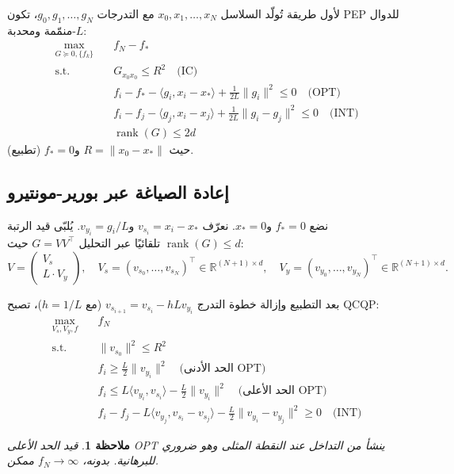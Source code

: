 \documentclass[12pt,a4paper]{article}
\newcommand{\R}{\mathbb{R}}
\theoremstyle{arabicremark}
\newtheorem{remark}{ملاحظة}
\begin{document}
لأول طريقة تُولّد السلاسل $x_0, x_1, \ldots, x_N$ مع التدرجات $g_0, g_1, \ldots, g_N$، تكون PEP للدوال $L$-منمّمة ومحدبة:
\begin{align}
\max_{G \succeq 0, \{f_k\}} \quad & f_N - f_* \\
\text{s.t.} \quad & G_{x_0 x_0} \leq R^2 \quad \text{(IC)} \\
& f_i - f_* - \langle g_i, x_i - x_*\rangle + \frac{1}{2L}\|g_i\|^2 \leq 0 \quad \text{(OPT)} \\
& f_i - f_j - \langle g_j, x_i - x_j\rangle + \frac{1}{2L}\|g_i - g_j\|^2 \leq 0 \quad \text{(INT)} \\
& \operatorname{rank}(G) \leq 2d
\end{align}
حيث $R = \|x_0 - x_*\|$ و$f_* = 0$ (تطبيع).

\subsection{إعادة الصياغة عبر بورير-مونتيرو}

نضع $f_* = 0$ و$x_* = 0$. نعرّف $v_{s_i} = x_i - x_*$ و$v_{y_i} = g_i / L$. يُلبّى قيد الرتبة $\operatorname{rank}(G) \leq d$ تلقائيًا عبر التحليل $G = VV^\top$ حيث:
\[
V = \begin{pmatrix} V_s \\ L \cdot V_y \end{pmatrix}, \quad V_s = (v_{s_0}, \ldots, v_{s_N})^\top \in \R^{(N+1)\times d}, \quad V_y = (v_{y_0}, \ldots, v_{y_N})^\top \in \R^{(N+1)\times d}.
\]

بعد التطبيع وإزالة خطوة التدرج $v_{s_{i+1}} = v_{s_i} - h L v_{y_i}$ (مع $h = 1/L$)، تصبح QCQP:
\begin{align}
\max_{V_s, V_y, f} \quad & f_N \\
\text{s.t.} \quad & \|v_{s_0}\|^2 \leq R^2 \\
& f_i \geq \frac{L}{2}\|v_{y_i}\|^2 \quad \text{(الحد الأدنى OPT)} \\
& f_i \leq L\langle v_{y_i}, v_{s_i}\rangle - \frac{L}{2}\|v_{y_i}\|^2 \quad \text{(الحد الأعلى OPT)} \\
& f_i - f_j - L\langle v_{y_j}, v_{s_i} - v_{s_j}\rangle - \frac{L}{2}\|v_{y_i} - v_{y_j}\|^2 \geq 0 \quad \text{(INT)}
\end{align}

\begin{remark}
قيد الحد الأعلى OPT ينشأ من التداخل عند النقطة المثلى وهو ضروري للبرهانية. بدونه، $f_N \to \infty$ ممكن.
\end{remark}
\end{document}
